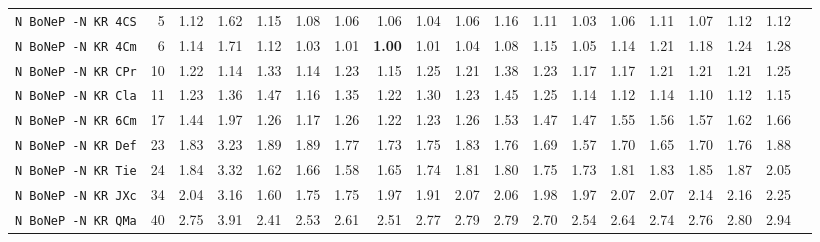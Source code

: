 \begin{tabular}{l | r @{~~} r | r@{~~}r@{~~}r@{~~}r@{~~}r@{~~}r@{~~}r@{~~}r@{~~}r@{~~}r@{~~}r@{~~}r@{~~}r@{~~}r@{~~}r@{~~}r|}
\verb+N BoNeP -N KR 4CS+ & 5 & 1.12 & 1.62&1.15&1.08&1.06&1.06&1.04&1.06&1.16&1.11&1.03&1.06&1.11&1.07&1.12&1.12\\
\verb+N BoNeP -N KR 4Cm+ & 6 & 1.14 & 1.71&1.12&1.03&1.01&\textbf{1.00}&1.01&1.04&1.08&1.15&1.05&1.14&1.21&1.18&1.24&1.28\\
\verb+N BoNeP -N KR CPr+ & 10 & 1.22 & 1.14&1.33&1.14&1.23&1.15&1.25&1.21&1.38&1.23&1.17&1.17&1.21&1.21&1.21&1.25\\
\verb+N BoNeP -N KR Cla+ & 11 & 1.23 & 1.36&1.47&1.16&1.35&1.22&1.30&1.23&1.45&1.25&1.14&1.12&1.14&1.10&1.12&1.15\\
\verb+N BoNeP -N KR 6Cm+ & 17 & 1.44 & 1.97&1.26&1.17&1.26&1.22&1.23&1.26&1.53&1.47&1.47&1.55&1.56&1.57&1.62&1.66\\
\verb+N BoNeP -N KR Def+ & 23 & 1.83 & 3.23&1.89&1.89&1.77&1.73&1.75&1.83&1.76&1.69&1.57&1.70&1.65&1.70&1.76&1.88\\
\verb+N BoNeP -N KR Tie+ & 24 & 1.84 & 3.32&1.62&1.66&1.58&1.65&1.74&1.81&1.80&1.75&1.73&1.81&1.83&1.85&1.87&2.05\\
\verb+N BoNeP -N KR JXc+ & 34 & 2.04 & 3.16&1.60&1.75&1.75&1.97&1.91&2.07&2.06&1.98&1.97&2.07&2.07&2.14&2.16&2.25\\
\verb+N BoNeP -N KR QMa+ & 40 & 2.75 & 3.91&2.41&2.53&2.61&2.51&2.77&2.79&2.79&2.70&2.54&2.64&2.74&2.76&2.80&2.94\\
\end{tabular}
